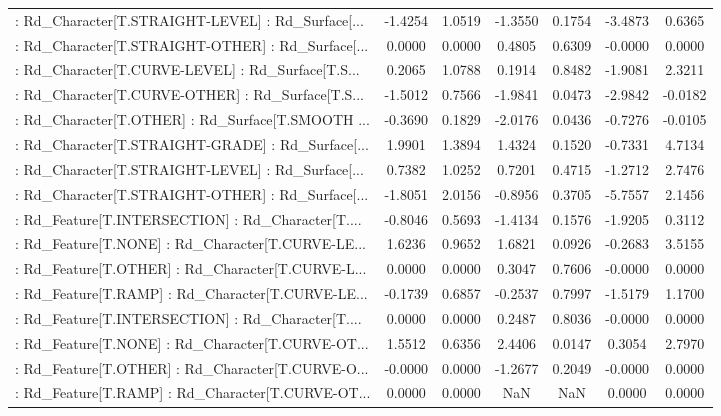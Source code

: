 \begin{longtable}{p{4cm}cccccc}
 : Rd\_Character[T.STRAIGHT-LEVEL] : Rd\_Surface[... & -1.4254 &    1.0519 & -1.3550 &       0.1754 & -3.4873 &  0.6365 \\
 : Rd\_Character[T.STRAIGHT-OTHER] : Rd\_Surface[... &  0.0000 &    0.0000 &  0.4805 &       0.6309 & -0.0000 &  0.0000 \\
 : Rd\_Character[T.CURVE-LEVEL] : Rd\_Surface[T.S... &  0.2065 &    1.0788 &  0.1914 &       0.8482 & -1.9081 &  2.3211 \\
 : Rd\_Character[T.CURVE-OTHER] : Rd\_Surface[T.S... & -1.5012 &    0.7566 & -1.9841 &       0.0473 & -2.9842 & -0.0182 \\
 : Rd\_Character[T.OTHER] : Rd\_Surface[T.SMOOTH ... & -0.3690 &    0.1829 & -2.0176 &       0.0436 & -0.7276 & -0.0105 \\
 : Rd\_Character[T.STRAIGHT-GRADE] : Rd\_Surface[... &  1.9901 &    1.3894 &  1.4324 &       0.1520 & -0.7331 &  4.7134 \\
 : Rd\_Character[T.STRAIGHT-LEVEL] : Rd\_Surface[... &  0.7382 &    1.0252 &  0.7201 &       0.4715 & -1.2712 &  2.7476 \\
 : Rd\_Character[T.STRAIGHT-OTHER] : Rd\_Surface[... & -1.8051 &    2.0156 & -0.8956 &       0.3705 & -5.7557 &  2.1456 \\
 : Rd\_Feature[T.INTERSECTION] : Rd\_Character[T.... & -0.8046 &    0.5693 & -1.4134 &       0.1576 & -1.9205 &  0.3112 \\
 : Rd\_Feature[T.NONE] : Rd\_Character[T.CURVE-LE... &  1.6236 &    0.9652 &  1.6821 &       0.0926 & -0.2683 &  3.5155 \\
 : Rd\_Feature[T.OTHER] : Rd\_Character[T.CURVE-L... &  0.0000 &    0.0000 &  0.3047 &       0.7606 & -0.0000 &  0.0000 \\
 : Rd\_Feature[T.RAMP] : Rd\_Character[T.CURVE-LE... & -0.1739 &    0.6857 & -0.2537 &       0.7997 & -1.5179 &  1.1700 \\
 : Rd\_Feature[T.INTERSECTION] : Rd\_Character[T.... &  0.0000 &    0.0000 &  0.2487 &       0.8036 & -0.0000 &  0.0000 \\
 : Rd\_Feature[T.NONE] : Rd\_Character[T.CURVE-OT... &  1.5512 &    0.6356 &  2.4406 &       0.0147 &  0.3054 &  2.7970 \\
 : Rd\_Feature[T.OTHER] : Rd\_Character[T.CURVE-O... & -0.0000 &    0.0000 & -1.2677 &       0.2049 & -0.0000 &  0.0000 \\
 : Rd\_Feature[T.RAMP] : Rd\_Character[T.CURVE-OT... &  0.0000 &    0.0000 &     NaN &          NaN &  0.0000 &  0.0000 \\

\end{longtable}
